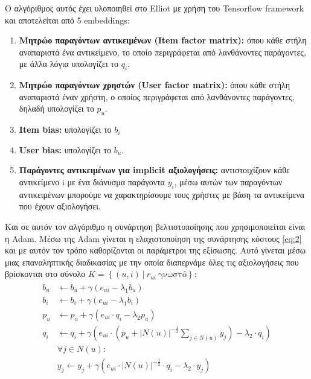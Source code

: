 Ο αλγόριθμος αυτός έχει υλοποιηθεί στο Elliot με χρήση του Tensorflow framework και αποτελείται από 5 embeddings:
\begin{enumerate}
	\item\textbf{Μητρώο παραγόντων αντικειμένων (Item factor matrix):} όπου κάθε στήλη αναπαριστά ένα αντικείμενο, το οποίο περιγράφεται από λανθάνοντες παράγοντες, με άλλα λόγια υπολογίζει το $ q_i $.
	\item \textbf{Μητρώο παραγόντων χρηστών (User factor matrix):} όπου κάθε στήλη αναπαριστά έναν χρήστη, ο οποίος περιγράφεται από λανθάνοντες παράγοντες, δηλαδή υπολογίζει το $ p_u $.
	\item\textbf{Item bias:} υπολογίζει το $  b_i $
	\item \textbf{User bias:} υπολογίζει το $  b_u $.
	\item \textbf{Παράγοντες αντικειμένων για implicit αξιολογήσεις:} αντιστοιχίζουν κάθε αντικείμενο i με ένα διάνυσμα παράγοντα $ y_i $, μέσω αυτών των παραγόντων αντικειμένων μπορούμε να χαρακτηρίσουμε τους χρήστες με βάση τα αντικείμενα που έχουν αξιολογήσει.
\end{enumerate}
Και σε αυτόν τον αλγόριθμο η συνάρτηση βελτιστοποίησης που χρησιμοποιείται είναι η Adam. Μέσω της Adam γίνεται η ελαχιστοποίηση της συνάρτησης κόστους \eqref{eq:2} και με αυτόν τον τρόπο καθορίζονται οι παράμετροι της εξίσωσης. Αυτό γίνεται μέσω μιας επαναληπτικής διαδικασίας με την οποία διαπερνάμε όλες τις αξιολογήσεις που βρίσκονται στο σύνολο $ K = \left\lbrace  (u, i)\: |\: r_{ui} \:\text{γνωστό} \right\rbrace  $:
\begin{align} 
	\begin{split}
	b_u &\leftarrow b_u  + \gamma (e_{ui} - \lambda_1 b_u)\\
	b_i &\leftarrow b_i + \gamma (e_{ui} - \lambda_1 b_i)\\
	p_u &\leftarrow p_u + \gamma (e_{ui} \cdot q_i - \lambda_2 p_u)\\
	q_i &\leftarrow q_i + \gamma \left( e_{ui} \cdot\left( p_u+\left|N(u)\right|^{-\frac{1}{2}}{\sum_{j\in N(u)} y_j}\right) -\lambda_2 \cdot q_i \right)\\
	 & \forall j \in N(u):\\ & y_j \leftarrow  y_j + \gamma \left( e_{ui} \cdot \left|N(u)\right|^{-\frac{1}{2}} \cdot q_i -\lambda_2 \cdot y_j \right)
   \end{split} 
\label{eq:3}
\end{align}
\leavevmode\newline \newline
